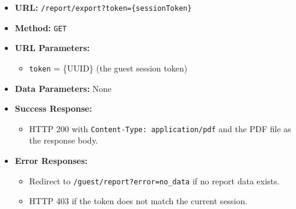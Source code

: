 \begin{itemize}
    \item \textbf{URL:} \texttt{/report/export?token=\{sessionToken\}}
    \item \textbf{Method:} \texttt{GET}
    \item \textbf{URL Parameters:}
    \begin{itemize}
        \item \texttt{token} = \{UUID\} (the guest session token)
    \end{itemize}
    \item \textbf{Data Parameters:} None
    \item \textbf{Success Response:}
    \begin{itemize}
        \item HTTP 200 with \texttt{Content-Type: application/pdf} and the PDF file as the response body.
    \end{itemize}
    \item \textbf{Error Responses:}
    \begin{itemize}
        \item Redirect to \texttt{/guest/report?error=no\_data} if no report data exists.
        \item HTTP 403 if the token does not match the current session.
    \end{itemize}
\end{itemize}
